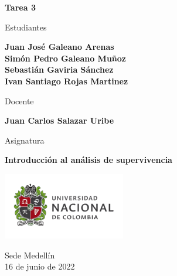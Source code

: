 \begin{titlepage}
   \Large{
   \begin{center}
       \vspace*{1cm}

       \textbf{Tarea 3}

            
       \vspace{1.1cm}
       
       Estudiantes
       
       \vspace{0.5cm}
        
	\textbf{Juan José Galeano Arenas} \\

       \textbf{Simón Pedro Galeano Muñoz} \\

	\textbf{Sebastián Gaviria Sánchez} \\

	\textbf{Ivan Santiago Rojas Martinez}

              \vspace{1cm}
       
       Docente
       
       \vspace{0.5cm}

       \textbf{Juan Carlos Salazar Uribe}
       
       \vspace{0.4cm}

       \vspace{1.4cm}
       
       Asignatura
       
       \vspace{0.5cm}

       \textbf{Introducción al análisis de supervivencia}

       \vfill

            
       \vspace{0.4cm}
     
       \includegraphics[width=0.4\textwidth]{logounal.png}
            
       Sede Medellín\\
       16 de junio de 2022
       
   \end{center}
   }
\end{titlepage}
